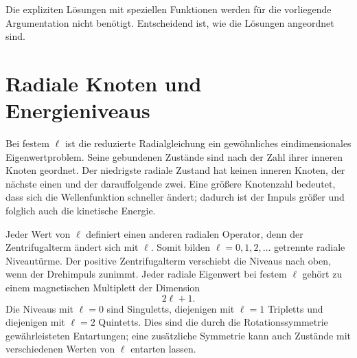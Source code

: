 \begin{classroomqa}\end{classroomqa}

\begin{classroomqa}\end{classroomqa}

Die expliziten Lösungen mit speziellen Funktionen werden für die vorliegende Argumentation nicht benötigt. Entscheidend ist, wie die Lösungen angeordnet sind.

\section{Radiale Knoten und Energieniveaus}

Bei festem \(\ell\) ist die reduzierte Radialgleichung ein gewöhnliches eindimensionales Eigenwertproblem. Seine gebundenen Zustände sind nach der Zahl ihrer inneren Knoten geordnet. Der niedrigste radiale Zustand hat keinen inneren Knoten, der nächste einen und der darauffolgende zwei. Eine größere Knotenzahl bedeutet, dass sich die Wellenfunktion schneller ändert; dadurch ist der Impuls größer und folglich auch die kinetische Energie.

Jeder Wert von \(\ell\) definiert einen anderen radialen Operator, denn der Zentrifugalterm ändert sich mit \(\ell\). Somit bilden \(\ell=0,1,2,\ldots\) getrennte radiale Niveautürme. Der positive Zentrifugalterm verschiebt die Niveaus nach oben, wenn der Drehimpuls zunimmt. Jeder radiale Eigenwert bei festem \(\ell\) gehört zu einem magnetischen Multiplett der Dimension
\begin{equation}
2\ell+1.
\end{equation}
Die Niveaus mit \(\ell=0\) sind Singuletts, diejenigen mit \(\ell=1\) Tripletts und diejenigen mit \(\ell=2\) Quintetts. Dies sind die durch die Rotationssymmetrie gewährleisteten Entartungen; eine zusätzliche Symmetrie kann auch Zustände mit verschiedenen Werten von \(\ell\) entarten lassen.

